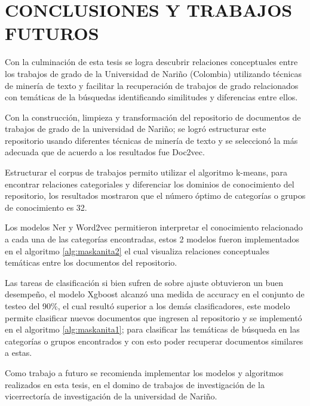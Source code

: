 \chapter{ CONCLUSIONES Y TRABAJOS FUTUROS}

Con la culminación de esta tesis se logra  descubrir relaciones conceptuales entre los trabajos de grado de la Universidad de Nariño (Colombia) utilizando técnicas de minería de texto y facilitar la recuperación de trabajos de grado relacionados con temáticas de la búsquedas identificando similitudes y diferencias entre ellos.

Con la construcción, limpieza y transformación del repositorio de documentos de trabajos de grado de la universidad de Nariño; se logró estructurar este repositorio usando diferentes técnicas de minería de texto y se seleccionó la más adecuada que de acuerdo a los resultados fue Doc2vec.

Estructurar  el corpus de trabajos permito utilizar el algoritmo k-means, para encontrar relaciones categoriales y diferenciar los dominios de conocimiento del repositorio, los resultados mostraron que el número óptimo de categorías o grupos de conocimiento es 32.

Los modelos  Ner y  Word2vec permitieron interpretar el conocimiento relacionado a cada una de las categorías encontradas, estos 2 modelos fueron implementados en el algoritmo \ref{alg:maskanita2} el cual visualiza relaciones conceptuales temáticas  entre los documentos del repositorio. 

Las tareas de clasificación si bien sufren de sobre ajuste obtuvieron un buen desempeño, el modelo Xgboost alcanzó una medida de accuracy en el conjunto de testeo del 90\%, el cual resultó superior a los demás clasificadores, este modelo permite clasificar nuevos documentos que ingresen al repositorio y se implementó en el algoritmo \ref{alg:maskanita1};  para clasificar las temáticas de búsqueda en las categorías o grupos encontrados y con esto poder recuperar documentos similares a estas. 

Como trabajo a futuro se recomienda implementar los modelos y algoritmos realizados en esta tesis, en el domino de trabajos de investigación de la vicerrectoría de investigación de la universidad de Nariño.  
